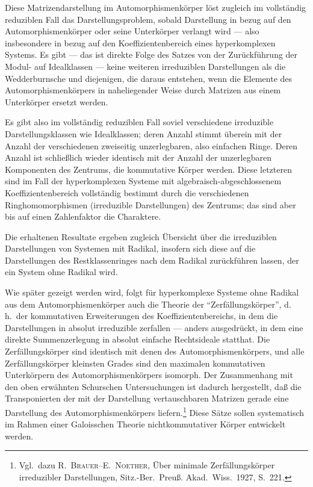 \documentclass[12pt,a4paper]{article}
\theoremstyle{definition}
\begin{document}
Diese Matrizendarstellung im Automorphismenk\"orper l\"ost zugleich im
vollst\"andig reduziblen Fall das Darstellungsproblem, sobald Darstellung
in bezug auf den Automorphismenk\"orper oder seine Unterk\"orper
verlangt wird --- also insbesondere in bezug auf den Koeffizientenbereich
eines hyperkomplexen Systems. Es gibt --- das ist direkte Folge des
Satzes von der Zur\"uckf\"uhrung der Modul- auf Idealklassen --- keine
weiteren irreduziblen Darstellungen als die Wedderburnsche und diejenigen,
die daraus entstehen, wenn die Elemente des Automorphismenk\"orpers in
naheliegender Weise durch Matrizen aus einem Unterk\"orper ersetzt werden.

Es gibt also im vollst\"andig reduziblen Fall soviel verschiedene
irreduzible Darstellungsklassen wie Idealklassen; deren Anzahl stimmt
\"uberein mit der Anzahl der verschiedenen zweiseitig unzerlegbaren, also
einfachen Ringe. Deren Anzahl ist schlie\ss lich wieder identisch mit der
Anzahl der unzerlegbaren Komponenten des Zentrums, die kommutative
K\"orper werden. Diese letzteren sind im Fall der hyperkomplexen Systeme
mit algebraisch-abgeschlossenem Koeffizientenbereich vollst\"andig
bestimmt durch die verschiedenen Ringhomomorphismen (irreduzible
Darstellungen) des Zentrums; das sind aber bis auf einen Zahlenfaktor die
Charaktere.

Die erhaltenen Resultate ergeben zugleich \"Ubersicht \"uber die
irreduziblen Darstellungen von Systemen mit Radikal, insofern sich diese
auf die Darstellungen des Restklassenringes nach dem Radikal
zur\"uckf\"uhren lassen, der ein System ohne Radikal wird.

Wie sp\"ater gezeigt werden wird, folgt f\"ur hyperkomplexe Systeme ohne
Radikal aus dem Automorphismenk\"orper auch die Theorie der
``Zerf\"allungsk\"orper'', d.\,h.\ der kommutativen Erweiterungen des
Koeffizientenbereichs, in dem die Darstellungen in absolut irreduzible
zerfallen --- anders ausgedr\"uckt, in dem eine direkte
Summenzerlegung in absolut einfache Rechtsideale statthat. Die
Zerf\"allungsk\"orper sind identisch mit denen des
Automorphismenk\"orpers, und alle Zerf\"allungsk\"orper kleinsten Grades
sind den maximalen kommutativen Unterk\"orpern des
Automorphismenk\"orpers isomorph. Der Zusammenhang mit den oben
erw\"ahnten Schurschen Untersuchungen ist dadurch hergestellt, da\ss{} die
Transponierten der mit der Darstellung vertauschbaren Matrizen gerade
eine Darstellung des Automorphismenk\"orpers liefern.\footnote{Vgl.\ dazu
R.\ \textsc{Brauer}--E.\ \textsc{Noether}, \"Uber minimale
Zerf\"allungsk\"orper irreduzibler Darstellungen, Sitz.-Ber.\ Preu\ss. Akad.\ Wiss.\ 1927, S.\ 221.} Diese S\"atze sollen systematisch im
Rahmen einer Galoisschen Theorie nichtkommutativer K\"orper entwickelt
werden.
\end{document}
